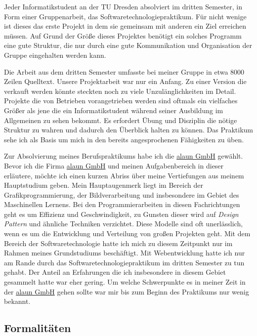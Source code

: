 \documentclass[12pt]{article}
\begin{document}
Jeder Informatikstudent an der TU Dresden absolviert im dritten Semester, in Form einer Gruppenarbeit, das Softwaretechnologiepraktikum.
Für nicht wenige ist dieses das erste Projekt in dem sie gemeinsam mit anderen ein Ziel erreichen müssen. 
Auf Grund der Größe dieses Projektes benötigt ein solches Programm eine gute Struktur, die nur durch eine
gute Kommunikation und Organisation der Gruppe eingehalten werden kann.

Die Arbeit aus dem dritten Semester umfasste bei meiner Gruppe in etwa 8000 Zeilen Quelltext. 
Unsere Projektarbeit war nur ein Anfang. Zu einer Version die verkauft werden könnte steckten noch zu viele Unzulänglichkeiten
im Detail.
Projekte die von Betrieben vorangetrieben werden sind oftmals ein vielfaches Größer als jene die ein
Informatikstudent während seiner Ausbildung im Allgemeinen zu sehen bekommt.
Es erfordert Übung und Disziplin die nötige Struktur zu wahren und dadurch den Überblick halten zu können.
Das Praktikum sehe ich als Basis um mich in den bereits angesprochenen Fähigkeiten zu üben.

Zur Absolvierung meines Berufspraktikums habe ich die \href{https://alaun.de/home/}{alaun GmbH} gewählt.
Bevor ich die Firma \href{https://alaun.de/home/}{alaun GmbH} und meinen Aufgabenbereich in dieser erläutere,
 möchte ich einen kurzen Abriss über meine Vertiefungen aus meinem Hauptstudium geben. 
Mein Hauptaugenmerk liegt im Bereich der Grafikprogrammierung, der Bildverarbeitung und insbesondere im Gebiet des Maschinellen Lernens.
Bei den Programmierarbeiten in diesen Fachrichtungen geht es um Effizienz und Geschwindigkeit, zu Gunsten dieser wird auf
\textit{Design Pattern} und ähnliche Techniken verzichtet. Diese Modelle sind oft unerlässlich, wenn es um die
Entwicklung und Verteilung von großen Projekten geht.
Mit dem Bereich der Softwaretechnologie hatte ich mich zu diesem Zeitpunkt nur im Rahmen meines Grundstudiums beschäftigt. 
Mit Webentwicklung hatte ich nur am Rande durch das Softwaretechnologiepraktikum im dritten Semester zu tun gehabt.
Der Anteil an Erfahrungen die ich insbesondere in diesem Gebiet gesammelt hatte war eher gering.
Um welche Schwerpunkte es in meiner Zeit in der \href{https://alaun.de/home/}{alaun GmbH} gehen sollte war mir bis zum
Beginn des Praktikums nur wenig bekannt.

\subsection{Formalitäten}
\end{document}
